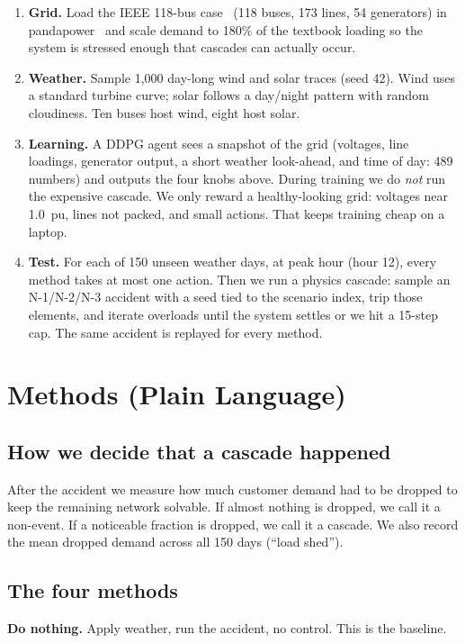 \documentclass[conference]{IEEEtran}
\begin{document}
\begin{enumerate}
\item \textbf{Grid.} Load the IEEE 118-bus case~\cite{b3} (118 buses, 173 lines, 54 generators) in pandapower~\cite{b4} and scale demand to 180\% of the textbook loading so the system is stressed enough that cascades can actually occur.
\item \textbf{Weather.} Sample 1{,}000 day-long wind and solar traces (seed 42). Wind uses a standard turbine curve; solar follows a day/night pattern with random cloudiness. Ten buses host wind, eight host solar.
\item \textbf{Learning.} A DDPG agent sees a snapshot of the grid (voltages, line loadings, generator output, a short weather look-ahead, and time of day: 489 numbers) and outputs the four knobs above. During training we do \emph{not} run the expensive cascade. We only reward a healthy-looking grid: voltages near 1.0~pu, lines not packed, and small actions. That keeps training cheap on a laptop.
\item \textbf{Test.} For each of 150 unseen weather days, at peak hour (hour 12), every method takes at most one action. Then we run a physics cascade: sample an N-1/N-2/N-3 accident with a seed tied to the scenario index, trip those elements, and iterate overloads until the system settles or we hit a 15-step cap. The same accident is replayed for every method.
\end{enumerate}

\section{Methods (Plain Language)}

\subsection{How we decide that a cascade happened}

After the accident we measure how much customer demand had to be dropped to keep the remaining network solvable. If almost nothing is dropped, we call it a non-event. If a noticeable fraction is dropped, we call it a cascade. We also record the mean dropped demand across all 150 days (``load shed'').

\subsection{The four methods}

\textbf{Do nothing.} Apply weather, run the accident, no control. This is the baseline.
\end{document}
